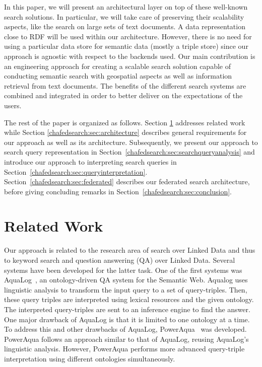 
In this paper, we will present an architectural layer on top of these well-known search solutions.
In particular, we will take care of preserving their scalability aspects, like the search on large sets of text documents.
A data representation close to RDF will be used within our architecture. 
However, there is no need for using a particular data store for semantic data (\ie mostly a triple store) since our approach is agnostic with respect to the backends used. %
Our main contribution is an engineering approach for creating a scalable search solution capable of conducting semantic search with geospatial aspects as well as information retrieval from text documents. The benefits of the different search systems are combined and integrated in order to better deliver on the expectations of the users. 
 
The rest of the paper is organized as follows. Section \ref{chafedsearch:sec:related} addresses related work while Section \ref{chafedsearch:sec:architecture} describes general requirements for our approach as well as its architecture.
Subsequently, we present our approach to search query representation in Section~\ref{chafedsearch:sec:searchqueryanalysis} and introduce our approach to interpreting search queries in Section~\ref{chafedsearch:sec:queryinterpretation}.
Section~\ref{chafedsearch:sec:federated} describes our federated search architecture, before giving concluding remarks in Section~\ref{chafedsearch:sec:conclusion}.


\section{Related Work}
\label{chafedsearch:sec:related}
Our approach is related to the research area of search over Linked Data and thus to keyword search and question answering (QA) over Linked Data.
Several systems have been developed for the latter task.
One of the first systems was AquaLog~\cite{aqualog}, an ontology-driven QA system for the Semantic Web. 
Aqualog uses linguistic analysis to transform the input query to a set of query-triples. 
Then, these query triples are interpreted using lexical resources and the given ontology. 
The interpreted query-triples are sent to an inference engine to find the answer.
One major drawback of AquaLog is that it is limited to one ontology at a time.
To address this and other drawbacks of AquaLog, PowerAqua~\cite{poweraqua} was developed.
PowerAqua follows an approach similar to that of AquaLog, reusing AquaLog's linguistic analysis.
However, PowerAqua performs more advanced query-triple interpretation using different ontologies simultaneously.


